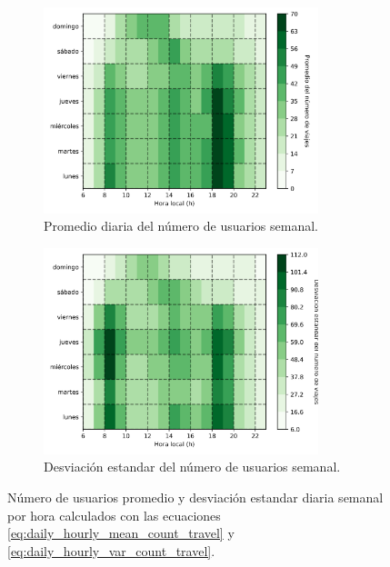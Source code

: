 \begin{figure}[H]
    \centering
    \begin{subfigure}[b]{8cm}
        \includegraphics[width=8cm]{Graphics/daily_hourly_mean_count_travel.png}
        \caption{Promedio diaria del número de usuarios semanal.}
        \label{fig:daily_hourly_mean_count_travel}
    \end{subfigure}
    \begin{subfigure}[b]{8cm}
        \includegraphics[width=8cm]{Graphics/daily_hourly_var_count_travel.png}
        \caption{Desviación estandar del número de usuarios semanal.}
        \label{fig:daily_hourly_var_count_travel}
    \end{subfigure}
    \caption{Número de usuarios promedio y desviación estandar diaria semanal por hora calculados con las ecuaciones \ref{eq:daily_hourly_mean_count_travel} y \ref{eq:daily_hourly_var_count_travel}.}
    \label{fig:daily_hourly_count_travel}
\end{figure}
